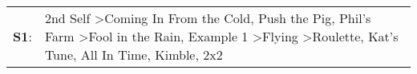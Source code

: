 \begin{supertabular}{p{0.03\textwidth}p{0.92\textwidth}}
 \textbf{S1}:  &  2nd Self\textsuperscript{} \textgreater \enspace Coming In From the Cold\textsuperscript{}, \enspace Push the Pig\textsuperscript{}, \enspace Phil's Farm\textsuperscript{} \textgreater \enspace Fool in the Rain\textsuperscript{}, \enspace Example 1\textsuperscript{} \textgreater \enspace Flying\textsuperscript{} \textgreater \enspace Roulette\textsuperscript{}, \enspace Kat's Tune\textsuperscript{}, \enspace All In Time\textsuperscript{}, \enspace Kimble\textsuperscript{}, \enspace 2x2\textsuperscript{}  \enspace  \\
\end{supertabular}
